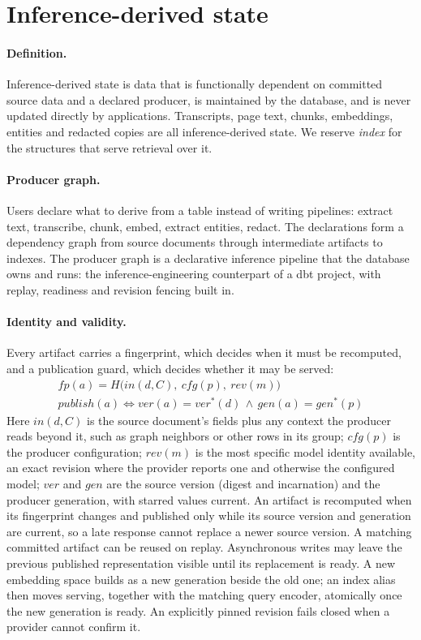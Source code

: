 \documentclass[sigconf,nonacm]{acmart}
\begin{document}
\section{Inference-derived state}
\label{sec:state}

\paragraph{Definition.} Inference-derived state is data that is functionally
dependent on committed source data and a declared producer, is maintained by
the database, and is never updated directly by applications. Transcripts,
page text, chunks, embeddings, entities and redacted copies are all
inference-derived state. We reserve \emph{index} for the structures that
serve retrieval over it.

\paragraph{Producer graph.} Users declare what to derive from a table instead
of writing pipelines: extract text, transcribe, chunk, embed, extract
entities, redact. The declarations form a dependency graph from source
documents through intermediate artifacts to indexes. The producer graph is a
declarative inference pipeline that the database owns and runs: the
inference-engineering counterpart of a dbt project, with replay, readiness
and revision fencing built in.

\paragraph{Identity and validity.} Every artifact carries a fingerprint,
which decides when it must be recomputed, and a publication guard, which
decides whether it may be served:
\begin{gather*}
\mathit{fp}(a) = H\big(\mathit{in}(d, C),\ \mathit{cfg}(p),\ \mathit{rev}(m)\big)\\
\mathit{publish}(a) \iff \mathit{ver}(a) = \mathit{ver}^{*}(d) \,\wedge\, \mathit{gen}(a) = \mathit{gen}^{*}(p)
\end{gather*}
Here $\mathit{in}(d, C)$ is the source document's fields plus any context the
producer reads beyond it, such as graph neighbors or other rows in its group;
$\mathit{cfg}(p)$ is the producer configuration; $\mathit{rev}(m)$ is the most
specific model identity available, an exact revision where the provider
reports one and otherwise the configured model; $\mathit{ver}$ and
$\mathit{gen}$ are the source version (digest and incarnation) and the
producer generation, with starred values current. An artifact is recomputed
when its fingerprint changes and published only while its source version and
generation are current, so a late response cannot replace a newer source version. A matching
committed artifact can be reused on replay. Asynchronous writes may leave the previous published
representation visible until its replacement is ready. A new embedding space
builds as a new generation beside the old one; an index alias then moves
serving, together with the matching query encoder, atomically once the new
generation is ready. An explicitly pinned revision fails closed when a
provider cannot confirm it.
\end{document}
